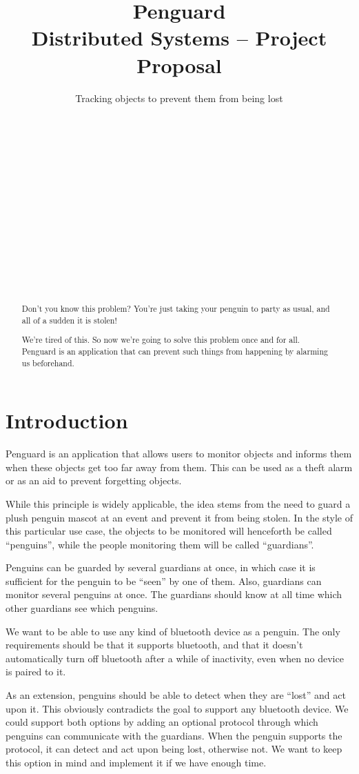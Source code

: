 \documentclass{report}
\title{Penguard\\
\normalsize{Distributed Systems -- Project Proposal}}
\subtitle{Tracking objects to prevent them from being lost}
\author{
\alignauthor {\normalsize Nils Leuzinger}\\
	\affaddr{{\normalsize 14-939-896}}\\
	\email{{\normalsize nilsl@student.ethz.ch}}
\alignauthor {\normalsize Nicole Thurnherr}\\
	\affaddr{{\normalsize 11-925-328}}\\
	\email{{\normalsize nicoleth@student.ethz.ch}}
\alignauthor {\normalsize Aline Abler}\\
	\affaddr{{\normalsize 14-920-979}}\\
	\email{{\normalsize ablera@student.ethz.ch}}
\and
\alignauthor {\normalsize Sascha Tribelhorn}\\
	\affaddr{{\normalsize XX-XXX-XXX}}\\
	\email{{\normalsize tsascha@student.ethz.ch}}
\alignauthor {\normalsize Luca Wolf}\\
	\affaddr{{\normalsize 12-913-539}}\\
	\email{{\normalsize lwolf@student.ethz.ch}}
\alignauthor {\normalsize Andris Suter-D\"orig}\\
	\affaddr{{\normalsize XX-XXX-XXX}}\\
	\email{{\normalsize sandris@student.ethz.ch}}
}
\begin{document}
\maketitle

\begin{abstract}
Don't you know this problem? You're just taking your penguin to party as usual, and all of a sudden it is stolen! 

We're tired of this. So now we're going to solve this problem once and for all. Penguard is an application that can prevent such things from happening by alarming us beforehand.
\end{abstract}

\section{Introduction}

Penguard is an application that allows users to monitor objects and informs them when these objects get too far away from them. This can be used as a theft alarm or as an aid to prevent forgetting objects.

While this principle is widely applicable, the idea stems from the need to guard a plush penguin mascot at an event and prevent it from being stolen. In the style of this particular use case, the objects to be monitored will henceforth be called ``penguins'', while the people monitoring them will be called ``guardians''.

Penguins can be guarded by several guardians at once, in which case it is sufficient for the penguin to be ``seen'' by one of them. Also, guardians can monitor several penguins at once. The guardians should know at all time which other guardians see which penguins.

We want to be able to use any kind of bluetooth device as a penguin. The only requirements should be that it supports bluetooth, and that it doesn't automatically turn off bluetooth after a while of inactivity, even when no device is paired to it.

As an extension, penguins should be able to detect when they are ``lost'' and act upon it. This obviously contradicts the goal to support any bluetooth device. We could support both options by adding an optional protocol through which penguins can communicate with the guardians. When the penguin supports the protocol, it can detect and act upon being lost, otherwise not. We want to keep this option in mind and implement it if we have enough time.
\end{document}
